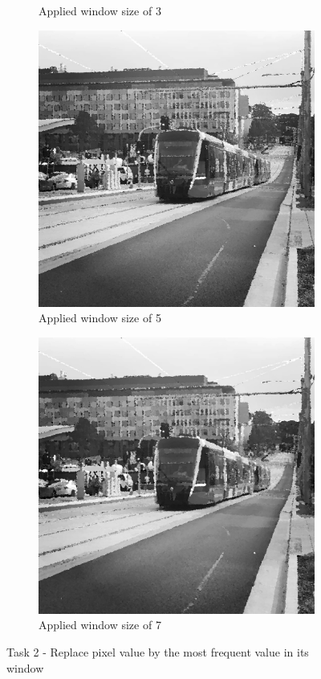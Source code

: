 \documentclass{article}
\begin{document}
\begin{figure}[!h]
\begin{subfigure}[b]{0.4\linewidth}
    \caption{Applied window size of 3}
  \end{subfigure}
  \begin{subfigure}[b]{0.4\linewidth}
    \includegraphics[width=\linewidth]{task2__light_rail_5.jpg}
    \caption{Applied window size of 5}
  \end{subfigure}
  \begin{subfigure}[b]{0.4\linewidth}
    \includegraphics[width=\linewidth]{task2__light_rail_7.jpg}
    \caption{Applied window size of 7}
  \end{subfigure}
  \caption{Task 2 - Replace pixel value by the most frequent value in its window}
  \label{fig:task2}
\end{figure}
\end{document}

